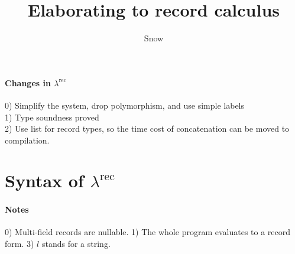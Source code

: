 \documentclass{article}
\title{Elaborating \calculus to record calculus \reccal}
\author{Snow}
\newcommand\reccal{$\lambda^{\text{rec}}$\xspace}
\begin{document}
\maketitle


\paragraph{Changes in \reccal}
0) Simplify the system, drop polymorphism, and use simple labels\\
1) Type soundness proved\\
2) Use list for record types, so the time cost of concatenation can be
moved to compilation.

\section{Syntax of \reccal}

\ottgrammartabular{
  \ottttyp
}

\ottgrammartabular{
  \otttexp
}


\paragraph{Notes}
0) Multi-field records are nullable.
1) The whole program evaluates to a record form.
3) $l$ stands for a string.



\ottdefnsValues

\ottdefnsTargetStep

\ottdefnsConcatTypes

\ottdefnsRecordTypes

\ottdefnsWellformedTypes


\ottdefnsConcatTypes
\end{document}

